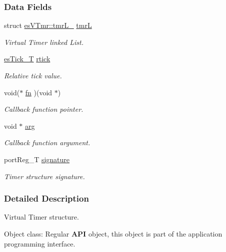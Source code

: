 \subsubsection*{Data Fields}
\begin{DoxyCompactItemize}
\item 
struct \hyperlink{structesVTmr_1_1tmrL__}{es\-V\-Tmr\-::tmr\-L\-\_\-} \hyperlink{structesVTmr_a1a73cb4cf2778a9e214afbcc36aa2692}{tmr\-L}
\begin{DoxyCompactList}\small\item\em Virtual Timer linked List. \end{DoxyCompactList}\item 
\hyperlink{group__kern__vtmr_ga844873888c186ee81eb66620dadb0451}{es\-Tick\-\_\-\-T} \hyperlink{structesVTmr_a4bbde49720b6aa0cc97e932ccb0383ea}{rtick}
\begin{DoxyCompactList}\small\item\em Relative tick value. \end{DoxyCompactList}\item 
void($\ast$ \hyperlink{structesVTmr_a17137ebfaf21de24d136b7d9b1390ddc}{fn} )(void $\ast$)
\begin{DoxyCompactList}\small\item\em Callback function pointer. \end{DoxyCompactList}\item 
void $\ast$ \hyperlink{structesVTmr_a4bd88651471b32f1fe71b4cec22756c0}{arg}
\begin{DoxyCompactList}\small\item\em Callback function argument. \end{DoxyCompactList}\item 
port\-Reg\-\_\-\-T \hyperlink{structesVTmr_a8a620761f277b95ead5fc6f52c898daf}{signature}
\begin{DoxyCompactList}\small\item\em Timer structure signature. \end{DoxyCompactList}\end{DoxyCompactItemize}


\subsubsection{Detailed Description}
Virtual Timer structure. 

\begin{DoxyParagraph}{Object class\-:}
Regular {\bfseries A\-P\-I} object, this object is part of the application programming interface. 
\end{DoxyParagraph}


